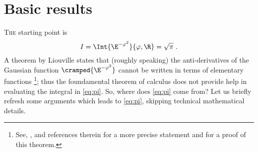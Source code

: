 
\section{Basic results}

\lettrine{T}{he} starting point  is 
\begin{equation}\label{eq:pi}
I = \Int{\E^{-\varphi^{2}}}{\varphi,\R} = \sqrt{\pi}  
\; .
\end{equation}
A theorem by Liouville states that (roughly speaking) the anti-derivatives of the Gaussian function
$\cramped{\E^{-\varphi^{2}}}$ cannot be written in terms of elementary functions%
\footnote{See, \eg, \textcite{Boros.Moll:2004} and references therein for a
   more precise statement and for a proof of this theorem.};
thus the foundamental theorem of calculus does not provide help in evaluating the integral in
\cref{eq:pi}. So, where does \cref{eq:pi} come from?
Let us briefly refresh some arguments which leads to
\cref{eq:pi}, skipping technical mathematical details.

